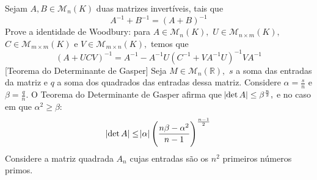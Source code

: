 \documentclass[11pt,a4paper]{article}
\begin{document}
 Sejam $A, B \in \mathcal{M}_n(K)$ duas matrizes invertíveis, tais que
\[
A^{-1} + B^{-1} = (A + B)^{-1}
\]
    \solucao{}
     Prove a identidade de Woodbury: para $A \in \mathcal{M}_n(K),$ $U \in \mathcal{M}_{n \times m}(K),$ $C \in \mathcal{M}_{m \times m}(K)$ e $V \in \mathcal{M}_{m \times n}(K),$ temos que
    \[\left(A + UCV \right)^{-1} = A^{-1} - A^{-1}U \left(C^{-1} + VA^{-1}U \right)^{-1} VA^{-1}
    \]
    \solucao{}
     [Teorema do Determinante de Gasper] 
    Seja $M \in \mathcal{M}_n(\mathbb{R}),$ $s$ a soma das entradas da matriz e $q$ a soma dos quadrados das entradas dessa matriz. Considere $\alpha = \frac{s}{n}$ e $\beta = \frac{q}{n}.$ O Teorema do Determinante de Gasper afirma que $\abs{\det A} \le \beta^{\frac{n}{2}},$ e no caso em que $\alpha^2 \ge \beta:$
    \[
    \abs{\det A} \le \abs{\alpha} \left(  \frac{n \beta - \alpha^2 }{n-1} \right)^{\frac{n-1}{2}}
    \]
        \solucao{}
     Considere a matriz quadrada $A_n$ cujas entradas são os $n^2$ primeiros números primos. 
    
        \solucao{}
        
\end{document}
